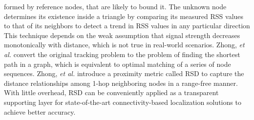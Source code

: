 formed by reference nodes, that are likely to bound it. The unknown node determines its existence inside a triangle by
comparing its measured RSS values to that of its neighbors to detect a trend in RSS values in any particular direction
This technique depends on the weak assumption that signal strength decreases monotonically with distance, which is not true in real-world scenarios.
Zhong, \emph{et al.} \cite{zhong2009tracking} convert the original tracking problem to the problem of finding the shortest path in a graph, which is equivalent to optimal matching of a series of node sequences. 
Zhong, \emph{et al.} \cite{zhong2009achieving} introduce a proximity metric called RSD to capture the distance relationships
among 1-hop neighboring nodes in a range-free manner. With little overhead, RSD can be conveniently applied as a transparent
supporting layer for state-of-the-art connectivity-based localization solutions to achieve better accuracy.




